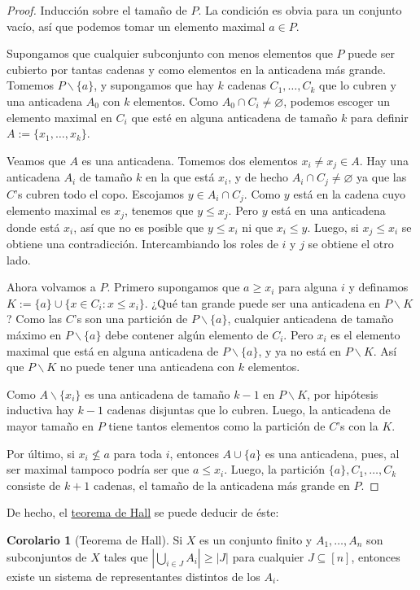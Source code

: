 \documentclass[spanish]{book}
\theoremstyle{definition}
\newtheorem*{coro}{Corolario}
\begin{document}
\begin{proof}
	Inducción sobre el tamaño de $P$. La condición es obvia para un conjunto vacío, así que podemos tomar un elemento maximal $a\in P$.
	
	Supongamos que cualquier subconjunto con menos elementos que $P$ puede ser cubierto por tantas cadenas y como elementos en la anticadena más grande. Tomemos $P\backslash\{a\}$, y supongamos que hay $k$ cadenas $C_1,\ldots,C_k$ que lo cubren y una anticadena $A_0$ con $k$ elementos. Como $A_0\cap C_i\neq\varnothing$, podemos escoger un elemento maximal en $C_i$ que esté en alguna anticadena de tamaño $k$ para definir $A:=\{x_1,\ldots,x_k\}$.
	
	Veamos que $A$ es una anticadena. Tomemos dos elementos $x_i\neq x_j\in A$. Hay una anticadena $A_i$ de tamaño $k$ en la que está $x_i$, y de hecho $A_i\cap C_j\neq\varnothing$ ya que las $C$'s cubren todo el copo. Escojamos $y\in A_i\cap C_j$. Como $y$ está en la cadena cuyo elemento maximal es $x_j$, tenemos que $y\leq x_j$. Pero $y$ está en una anticadena donde está $x_i$, así que no es posible que $y\leq x_i$ ni que $x_i\leq y$. Luego, si $x_j\leq x_i$ se obtiene una contradicción. Intercambiando los roles de $i$ y $j$ se obtiene el otro lado.
	
	Ahora volvamos a $P$. Primero supongamos que $a\geq x_i$ para alguna $i$ y definamos $K:=\{a\}\cup\{x\in C_i:x\leq x_i\}$. ¿Qué tan grande puede ser una anticadena en $P\backslash K$? Como las $C$'s son una partición de $P\backslash\{a\}$, cualquier anticadena de tamaño máximo en $P\backslash\{a\}$ debe contener algún elemento de $C_i$. Pero $x_i$ es el elemento maximal que está en alguna anticadena de $P\backslash\{a\}$, y ya no está en $P\backslash K$. Así que $P\backslash K$ no puede tener una anticadena con $k$ elementos.
	
	Como $A\backslash\{x_i\}$ es una anticadena de tamaño $k-1$ en $P\backslash K$, por hipótesis inductiva hay $k-1$ cadenas disjuntas que lo cubren. Luego, la anticadena de mayor tamaño en $P$ tiene tantos elementos como la partición de $C$'s con la $K$.
	
	Por último, si $x_i\not\leq a$ para toda $i$, entonces $A\cup \{a\}$ es una anticadena, pues, al ser maximal tampoco podría ser que $a\leq x_i$. Luego, la partición $\{a\},C_1,\ldots,C_k$ consiste de $k+1$ cadenas, el tamaño de la anticadena más grande en $P$.
\end{proof}
De hecho, el \hyperref[chap:hall]{teorema de Hall} se puede deducir de éste:
\begin{coro}[Teorema de Hall]
	Si $X$ es un conjunto finito y $A_1,\ldots,A_n$ son subconjuntos de $X$ tales que $\left|\bigcup_{i\in J}A_i\right|\geq|J|$ para cualquier $J\subseteq[n]$, entonces existe un sistema de representantes distintos de los $A_i$.
\end{coro}
\end{document}
